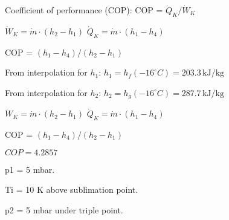 Coefficient of performance (COP):  
COP = \( \dot{Q}_K / \dot{W}_K \)  

\( \dot{W}_K = \dot{m} \cdot (h_2 - h_1) \)  
\( \dot{Q}_K = \dot{m} \cdot (h_1 - h_4) \)  

COP = \( (h_1 - h_4) / (h_2 - h_1) \)  

From interpolation for \( h_1 \):  
\( h_1 = h_f (-16^\circ C) = 203.3 \, \text{kJ/kg} \)  

From interpolation for \( h_2 \):  
\( h_2 = h_g (-16^\circ C) = 287.7 \, \text{kJ/kg} \)  

\( \dot{W}_K = \dot{m} \cdot (h_2 - h_1) \)  
\( \dot{Q}_K = \dot{m} \cdot (h_1 - h_4) \)  

COP = \( (h_1 - h_4) / (h_2 - h_1) \)  

\( COP = 4.2857 \)

p1 = 5 mbar.  

Ti = 10 K above sublimation point.  

p2 = 5 mbar under triple point.